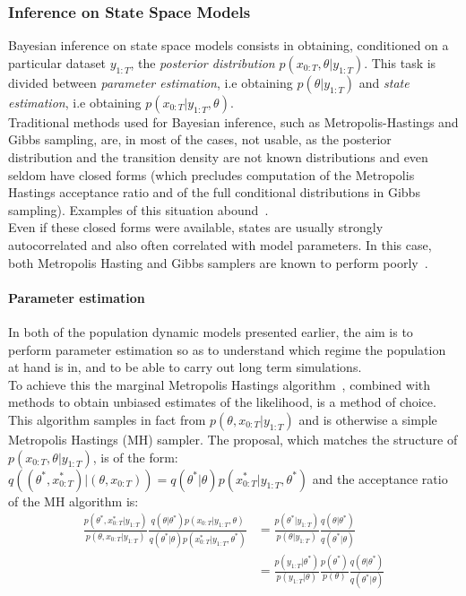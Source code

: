 \documentclass[12pt]{article}
\begin{document}
	\subsubsection{Inference on State Space Models}
	Bayesian inference on state space models consists in obtaining, conditioned on a particular dataset $y_{1:T}$, the \emph{posterior distribution} $p(x_{0:T}, \theta| y_{1:T})$. This task is divided between \emph{parameter estimation}, i.e obtaining $p(\theta | y_{1:T})$  and \emph{state estimation}, i.e obtaining $p(x_{0:T}|y_{1:T}, \theta)$. \\
	Traditional methods used for Bayesian inference, such as Metropolis-Hastings and Gibbs sampling, are, in most of the cases, not usable, as the posterior distribution and the transition density are not known distributions and even seldom have closed forms (which precludes computation of the Metropolis Hastings acceptance ratio and of the full conditional distributions in Gibbs sampling). Examples of this situation abound~\cite{beskos2006exact, fearnhead2008particle, murray2011particle}.\\
	Even if these closed forms were available, states are usually strongly autocorrelated and also often correlated with model parameters. In this case, both Metropolis Hasting and Gibbs samplers are known to perform poorly~\cite{van2011partially}. \\

	
	\paragraph{Parameter estimation}
	In both of the population dynamic models presented earlier, the aim is to perform parameter estimation so as to understand which regime the population at hand is in, and to be able to carry out long term simulations. \\
	To achieve this the marginal Metropolis Hastings algorithm~\cite{hastings1970monte}, combined with methods to obtain unbiased estimates of the likelihood, is a method of choice. \\
	This algorithm samples in fact from $p(\theta, x_{0:T} | y_{1:T})$ and is otherwise a simple Metropolis Hastings (MH) sampler. The proposal, which matches the structure of $p(x_{0:T}, \theta | y_{1:T})$, is of the form: $q((\theta^*, x_{0:T}^*) | (\theta, x_{0:T})) = q(\theta^* | \theta)p(x_{0:T}^* | y_{1:T}, \theta^*)$ and the acceptance ratio of the MH algorithm is: 
	\begin{align*}
	\frac{p(\theta^*, x_{0:T}^* | y_{1:T})}{p(\theta, x_{0:T} | y_{1:T})}\frac{q(\theta | \theta^*)p(x_{0:T} | y_{1:T}, \theta)}{q(\theta^* | \theta)p(x_{0:T}^* | y_{1:T}, \theta^*)} & = \frac{p(\theta^* | y_{1:T})}{p(\theta | y_{1:T})}\frac{q(\theta | \theta^*)}{q(\theta^* | \theta)} \\
	& = \frac{p(y_{1:T} | \theta^*)}{p(y_{1:T}|\theta)}\frac{p(\theta^*)}{p(\theta)}\frac{q(\theta | \theta^*)}{q(\theta^* | \theta)}
	\end{align*}
	
\end{document}
